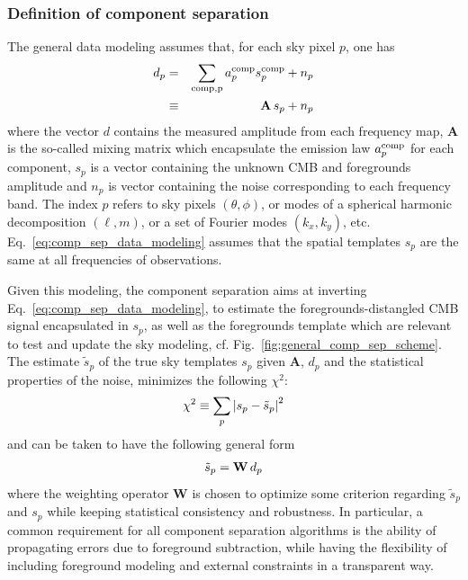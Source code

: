\subsubsection{Definition of component separation}
The general data modeling assumes that, for each sky pixel $p$, one has
\begin{eqnarray}
	\centering	
		d_p &=& \sum_{\rm comp, p} a_p^{\rm comp} s^{\rm comp}_p + n_p\\
		 &\equiv& \mathbf{A}\,s_p + n_p
	\label{eq:comp_sep_data_modeling}
\end{eqnarray}
where the vector $d$ contains the measured amplitude from each frequency map, $\mathbf{A}$ is the so-called mixing matrix which encapsulate the emission law $a_p^{\rm comp}$ for each component, $s_p$ is a vector containing the unknown CMB and foregrounds amplitude and $n_p$ is vector containing the noise corresponding to each frequency band. The index $p$ refers to sky pixels $\left( \theta, \phi \right)$, or modes of a spherical harmonic decomposition $\left( \ell, m\right)$, or a set of Fourier modes $\left(k_x,k_y\right)$, etc. Eq.~\ref{eq:comp_sep_data_modeling} assumes that the spatial templates $s_p$ are the same at all frequencies of observations.

Given this modeling, the component separation aims at inverting Eq.~\ref{eq:comp_sep_data_modeling}, to estimate the foregrounds-distangled CMB signal encapsulated in $s_p$, as well as the foregrounds template which are relevant to test and update the sky modeling, cf. Fig.~\ref{fig:general_comp_sep_scheme}.
The estimate $\tilde{s}_p$ of the true sky templates $s_p$ given $\mathbf{A}$, $d_p$ and the statistical properties of the noise, minimizes the following $\chi^2$:
\begin{eqnarray}
	\centering
		\chi^2 \equiv \sum_p \left| s_p - \tilde{s}_p\right|^2
	\label{eq:chi2_compsep}
\end{eqnarray}
and can be taken to have the following general form
\begin{eqnarray}
	\centering
		\tilde{s}_p = \mathbf{W}\,d_p
	\label{eq:sp_solution}
\end{eqnarray}
where the weighting operator $\mathbf{W}$ is chosen to optimize some criterion regarding $\tilde{s}_p$ and $s_p$ while keeping statistical consistency and robustness. In particular, a common requirement for all component separation algorithms is the ability of propagating errors due to foreground subtraction, while having the flexibility of including foreground modeling and external constraints in a transparent way. 

